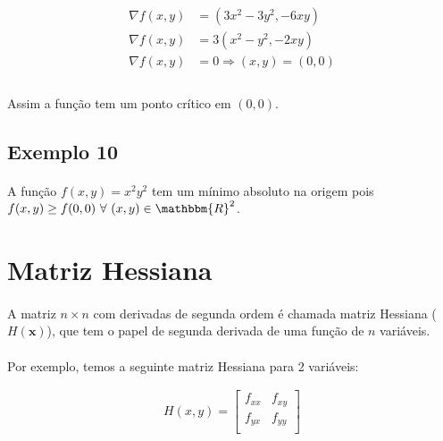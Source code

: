 \documentclass{article}
\begin{document}
            \begin{align*}
                \nabla f(x, y) &= (3x^2 - 3y^2, -6xy)\\
                \nabla f(x, y) &= 3 (x^2 - y^2, -2xy)\\
                \nabla f(x, y) &= 0 \Rightarrow (x, y) = (0,0)\\
            \end{align*}

            \paragraph{}
            Assim a função tem um ponto crítico em $(0,0)$.

        \subsection{Exemplo 10}
            \paragraph{}
            A função $f(x, y) = x^2y^2$ tem um mínimo absoluto na origem pois $f(x, y) \geq f(0,0) \text{ }\forall\text{ } (x, y) \in \mathbbm{R}^2$.
    
    \section{Matriz Hessiana}
        \paragraph{}
        A matriz $n \times n$ com derivadas de segunda ordem é chamada matriz Hessiana ($H(\textbf{x})$), que tem o papel
        de segunda derivada de uma função de $n$ variáveis.
        \paragraph{}
        Por exemplo, temos a seguinte matriz Hessiana para 2 variáveis:

        \begin{align*}
            H(x, y) = 
                \begin{bmatrix}
                    f_{xx}&f_{xy}\\
                    f_{yx}&f_{yy}\\
                \end{bmatrix}
        \end{align*}
\end{document}
